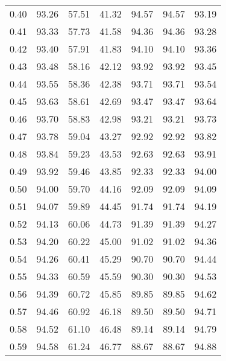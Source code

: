 \begin{tabular}{|c|c|c|c|c|c|c|}
      0.40 &     93.26 &     57.51 &      41.32 &   94.57 &      94.57 &         93.19 \\
      0.41 &     93.33 &     57.73 &      41.58 &   94.36 &      94.36 &         93.28 \\
      0.42 &     93.40 &     57.91 &      41.83 &   94.10 &      94.10 &         93.36 \\
      0.43 &     93.48 &     58.16 &      42.12 &   93.92 &      93.92 &         93.45 \\
      0.44 &     93.55 &     58.36 &      42.38 &   93.71 &      93.71 &         93.54 \\
      0.45 &     93.63 &     58.61 &      42.69 &   93.47 &      93.47 &         93.64 \\
      0.46 &     93.70 &     58.83 &      42.98 &   93.21 &      93.21 &         93.73 \\
      0.47 &     93.78 &     59.04 &      43.27 &   92.92 &      92.92 &         93.82 \\
      0.48 &     93.84 &     59.23 &      43.53 &   92.63 &      92.63 &         93.91 \\
      0.49 &     93.92 &     59.46 &      43.85 &   92.33 &      92.33 &         94.00 \\
      0.50 &     94.00 &     59.70 &      44.16 &   92.09 &      92.09 &         94.09 \\
      0.51 &     94.07 &     59.89 &      44.45 &   91.74 &      91.74 &         94.19 \\
      0.52 &     94.13 &     60.06 &      44.73 &   91.39 &      91.39 &         94.27 \\
      0.53 &     94.20 &     60.22 &      45.00 &   91.02 &      91.02 &         94.36 \\
      0.54 &     94.26 &     60.41 &      45.29 &   90.70 &      90.70 &         94.44 \\
      0.55 &     94.33 &     60.59 &      45.59 &   90.30 &      90.30 &         94.53 \\
      0.56 &     94.39 &     60.72 &      45.85 &   89.85 &      89.85 &         94.62 \\
      0.57 &     94.46 &     60.92 &      46.18 &   89.50 &      89.50 &         94.71 \\
      0.58 &     94.52 &     61.10 &      46.48 &   89.14 &      89.14 &         94.79 \\
      0.59 &     94.58 &     61.24 &      46.77 &   88.67 &      88.67 &         94.88 \\

\end{tabular}
